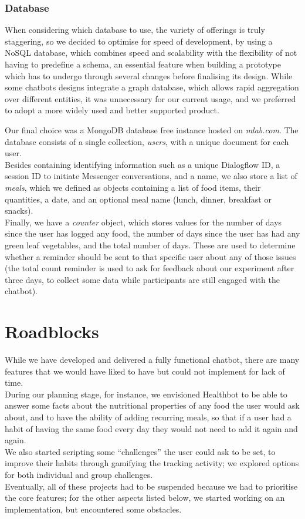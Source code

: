 \subsubsection{Database}
When considering which database to use, the variety of offerings is truly staggering, so we decided to optimise for speed of development, by using a NoSQL database, which combines speed and scalability with the flexibility of not having to predefine a schema, an essential feature when building a prototype which has to undergo through several changes before finalising its design. While some chatbots designs integrate a graph database, which allows rapid aggregation over different entities, it was unnecessary for our current usage, and we preferred to adopt a more widely used and better supported product.

Our final choice was a MongoDB database free instance hosted on \textit{mlab.com}. The database consists of a single collection, \textit{users}, with a unique document for each user. \\
Besides containing identifying information such as a unique Dialogflow ID, a session ID to initiate Messenger conversations, and a name, we also store a list of \textit{meals}, which we defined as objects containing a list of food items, their quantities, a date, and an optional meal name (lunch, dinner, breakfast or snacks). \\
Finally, we have a \textit{counter} object, which stores values for the number of days since the user has logged any food, the number of days since the user has had any green leaf vegetables, and the total number of days. These are used to determine whether a reminder should be sent to that specific user about any of those issues (the total count reminder is used to ask for feedback about our experiment after three days, to collect some data while participants are still engaged with the chatbot).
\section{Roadblocks}
While we have developed and delivered a fully functional chatbot, there are many features that we would have liked to have but could not implement for lack of time. \\
During our planning stage, for instance, we envisioned Healthbot to be able to answer some facts about the nutritional properties of any food the user would ask about, and to have the ability of adding recurring meals, so that if a user had a habit of having the same food every day they would not need to add it again and again. \\
We also started scripting some ``challenges'' the user could ask to be set, to improve their habits through gamifying the tracking activity; we explored options for both individual and group challenges.\\
Eventually, all of these projects had to be suspended because we had to prioritise the core features; for the other aspects listed below, we started working on an implementation, but encountered some obstacles.
